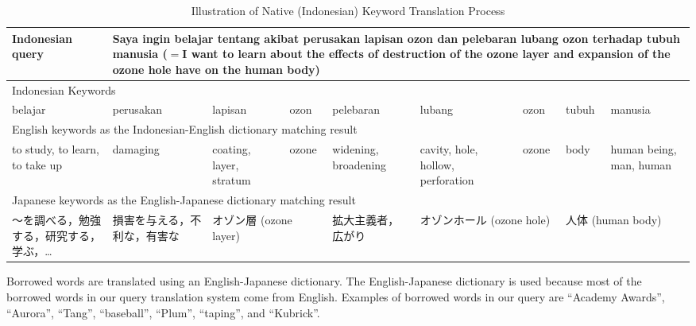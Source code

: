 \documentclass[english]{jnlp_1.3c}
\begin{document}
\begin{table}[t]
  \caption{Illustration of Native (Indonesian) Keyword Translation Process}
  \label{table:translation_process}
        \begin{tabular}{|p{}|p{}|p{}|p{}|p{}|p{}|p{}|p{}|p{}|}
\hline
      Indonesian query &
      \multicolumn{8}{l|}{
          \begin{minipage}[t]{39zw}
	Saya ingin belajar tentang akibat perusakan lapisan ozon
	dan pelebaran lubang ozon terhadap tubuh manusia
	($=$I want to learn about the effects of destruction of the
	ozone layer and expansion of the ozone hole have on the
	human body)
      \end{minipage}} \\ \hline
     \multicolumn{9}{|l|}{Indonesian Keywords} \\ \hline
     belajar & perusakan & lapisan & ozon & pelebaran & lubang & ozon &
     tubuh & manusia \\ \hline
     \multicolumn{9}{|l|}{English keywords as the Indonesian-English
     dictionary matching result} \\ \hline
     to study, to learn, to take up & damaging & coating, layer, stratum & ozone & widening, broadening & cavity, hole, hollow, perforation & ozone & body & human being, man, human \\ \hline
     \multicolumn{9}{|l|}{Japanese keywords as the English-Japanese
     dictionary matching result} \\ \hline
     〜を調べる，勉強する，研究する，学ぶ，… &
     損害を与える，不利な，有害な &
     \multicolumn{2}{p{8zw}|}{オゾン層 (ozone layer)} &
     拡大主義者，広がり &
     \multicolumn{2}{p{9zw}|}{オゾンホール (ozone hole)} &
     \multicolumn{2}{p{9zw}|}{人体 (human body)} \\ \hline
    \end{tabular}
\end{table}


Borrowed words are translated using an English-Japanese dictionary. The
English-Japanese dictionary is used because most of the borrowed words
in our query translation system come from English. Examples of borrowed
words in our query are ``Academy Awards'', ``Aurora'', ``Tang'',
``baseball'', ``Plum'', ``taping'', and ``Kubrick''.  
\end{document}
